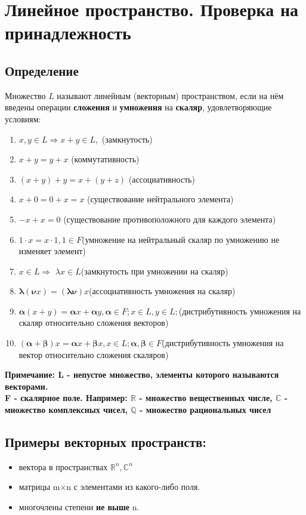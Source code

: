 \documentclass[12pt]{article}
\begin{document}
\section{Линейное пространство. Проверка на принадлежность}
\subsection{Определение}
Множество $L$ называют линейным (векторным) пространством, если на нём введены операции \textbf{сложения} и {\bf умножения} на {\bf скаляр}, удовлетворяющие условиям:
\begin{enumerate}
    \item $x,y \in L \Rightarrow x + y \in L, $ (замкнутость)
    \item $x+y = y+x $ (коммутативность)
    \item $(x+y)+y=x+(y+z)$ (ассоциативность)
    \item $x+0=0+x=x$ (существование нейтрального элемента)
    \item $-x+x=0$ (существование противоположного для каждого элемента)
    \item $1 \cdot x=x \cdot 1, 1 \in F$(умножение на нейтральный скаляр по умножению не изменяет элемент)
    \item $x \in L \Rightarrow $ $\lambda x \in L$(замкнутость при умножении на скаляр)
    \item $\mathbf{\lambda} (\mathbf{\nu} x)=(\mathbf{\lambda \nu})x$(ассоциативность умножения на скаляр)
    \item $\mathbf{\alpha}(x+y)=\mathbf{\alpha}x+\mathbf{\alpha}y, \mathbf{\alpha}\in F; x \in L,y \in L;$(дистрибутивность умножения на скаляр относительно сложения векторов)
    \item $(\mathbf{\alpha}+\mathbf{\beta})x=\mathbf{\alpha}x+\mathbf{\beta}x, x \in L; \mathbf{\alpha} , \mathbf{\beta} \in F$(дистрибутивность умножения на вектор относительно сложения скаляров)

\end{enumerate}
\textbf{Примечание: L - непустое множество, элементы которого называются векторами.}\\
\textbf{F - скалярное поле. Например: $\mathbb{R}$ - множество вещественных числе, $\mathbb{C}$ - множество комплексных чисел, $\mathbb{Q}$ - множество рациональных чисел}
\subsection{Примеры векторных пространств:}
\begin{itemize}
    \item вектора в пространствах $\mathbb{R}^n, \mathbb{C}^n$
    \item матрицы m$\times$n с элементами из какого-либо поля.
    \item многочлены степени {\bf не выше} n.
\end{itemize}
\end{document}
